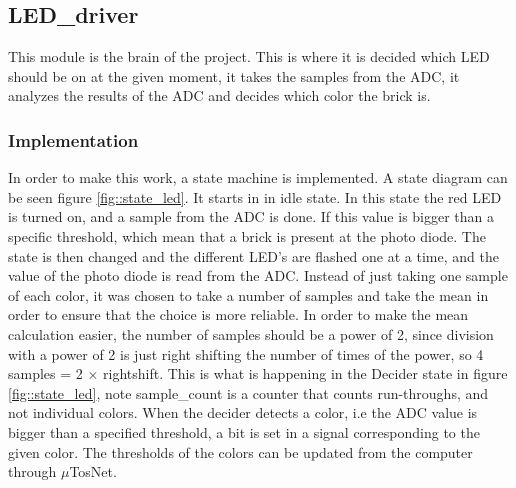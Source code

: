\subsection{LED\_driver}
This module is the brain of the project. This is where it is decided which LED should be on at the given moment, it takes the samples from the ADC, it analyzes the results of the ADC and decides which color the brick is.

\subsubsection{Implementation}
In order to make this work, a state machine is implemented. A state diagram can be seen figure \ref{fig::state_led}. It starts in in idle state. In this state the red LED is turned on, and a sample from the ADC is done. If this value is bigger than a specific threshold, which mean that a brick is present at the photo diode. The state is then changed and the different LED's are flashed one at a time, and the value of the photo diode is read from the ADC. Instead of just taking one sample of each color, it was chosen to take a number of samples and take the mean in order to ensure that the choice is more reliable. In order to make the mean calculation easier, the number of samples should be a power of 2, since division with a power of 2 is just right shifting the number of times of the power, so 4 samples = 2 $\times$ rightshift. This is what is happening in the Decider state in figure \ref{fig::state_led}, note sample\_count is a counter that counts run-throughs, and not individual colors. When the decider detects a color, i.e the ADC value is bigger than a specified threshold, a bit is set in a signal corresponding to the given color. The thresholds of the colors can be updated from the computer through $\mu$TosNet. 

